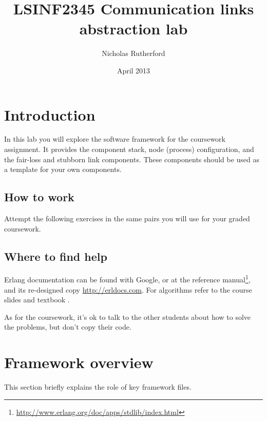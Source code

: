 \documentclass[a4paper]{article}
\title{LSINF2345 Communication links abstraction lab}
\author{Nicholas Rutherford}
\date{April 2013}
\begin{document}
\lstset{language=erlang}

\ifpdf
{}
\else
{}
\fi

\maketitle


\section{Introduction}

In this lab you will explore the software framework for the coursework
assignment. It provides the component stack, node (process) configuration,
and the fair-loss and stubborn link components. These components should be
used as a template for your own components.

\subsection{How to work} %
\label{sub:how_to_work}

Attempt the following exercises in the same pairs you will use for your graded
coursework.


\subsection{Where to find help} %
\label{sub:where_to_find_help}

Erlang documentation can be found with Google, or at the reference
manual\footnote{\url{http://www.erlang.org/doc/apps/stdlib/index.html}}, and
its re-designed copy \url{http://erldocs.com}.
For algorithms refer to the course slides and textbook \cite{cachin2011}.

As for the coursework, it's ok to talk to the other students about how to
solve the problems, but don't copy their code.


\section{Framework overview} %
\label{sec:framework_overview}

This section briefly explains the role of key framework files.
\end{document}
